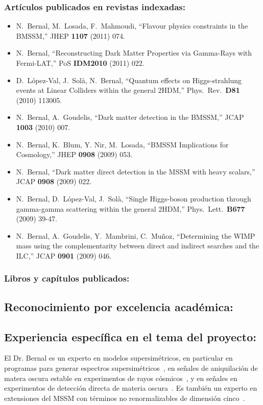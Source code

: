 \subsubsection{Artículos publicados en revistas indexadas:}
\begin{itemize}
\item   N.~Bernal, M.~Losada, F.~Mahmoudi,
  ``Flavour physics constraints in the BMSSM,''
  JHEP {\bf 1107 } (2011)  074.

\item   N.~Bernal,
  ``Reconstructing Dark Matter Properties via Gamma-Rays with Fermi-LAT,''
  PoS {\bf IDM2010 } (2011)  022.

\item   D.~López-Val, J.~Solà, N.~Bernal,
  ``Quantum effects on Higgs-strahlung events at Linear Colliders within the general 2HDM,''
  Phys.\ Rev.\  {\bf D81 } (2010)  113005.

\item   N.~Bernal, A.~Goudelis,
  ``Dark matter detection in the BMSSM,''
  JCAP {\bf 1003 } (2010)  007.

\item   N.~Bernal, K.~Blum, Y. Nir, M.~Losada,
  ``BMSSM Implications for Cosmology,''
  JHEP {\bf 0908 } (2009)  053.

\item   N.~Bernal,
  ``Dark matter direct detection in the MSSM with heavy scalars,''
  JCAP {\bf 0908 } (2009)  022.

\item   N.~Bernal, D.~López-Val, J.~Solà,
  ``Single Higgs-boson production through gamma-gamma scattering within the general 2HDM,''
  Phys.\ Lett.\  {\bf B677 } (2009)  39-47.

\item   N.~Bernal, A.~Goudelis, Y.~Mambrini, C.~Muñoz,
  ``Determining the WIMP mass using the complementarity between direct and indirect searches and the ILC,''
  JCAP {\bf 0901 } (2009)  046.

\end{itemize}
\subsubsection{Libros y capítulos publicados:}
\subsection{Reconocimiento por excelencia académica:}
\subsection{Experiencia específica en el tema del proyecto:}
El Dr. Bernal es un experto en modelos supersimétricos, en particular
en programas para generar espectros supersimétricos~\cite{Bernal:2007uv}, en señales de
aniquilación de matera oscura estable en experimentos de rayos
cósmicos~\cite{Bernal:2011pz,Bernal:2010ip,Bernal:2008zk}, y en señales en experimentos de detección directa de materia
oscura~\cite{Bernal:2009tt}. Es también un experto en extensiones del MSSM con términos no
renormalizables de dimensión cinco~\cite{Bernal:2011pj,Bernal:2010uf,Bernal:2009jc,Bernal:2009hd}.

